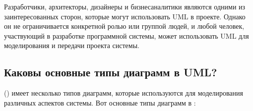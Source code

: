 \documentclass[letterpaper,10pt,russian]{sphinxmanual}
\begin{document}
\sphinxAtStartPar
Разработчики, архитекторы, дизайнеры и бизнес\sphinxhyphen{}аналитики являются одними из заинтересованных сторон, которые могут использовать UML в проекте. Однако он не ограничивается конкретной ролью или группой людей, и любой человек, участвующий в разработке программной системы, может использовать UML для моделирования и передачи проекта системы.


\subsection{Каковы основные типы диаграмм в UML?}
\label{\detokenize{educational_materials/uml/content:id3}}
\sphinxAtStartPar
{}

\sphinxAtStartPar
{} () имеет несколько типов диаграмм, которые используются для моделирования различных аспектов системы. Вот основные типы диаграмм в :
\end{document}
